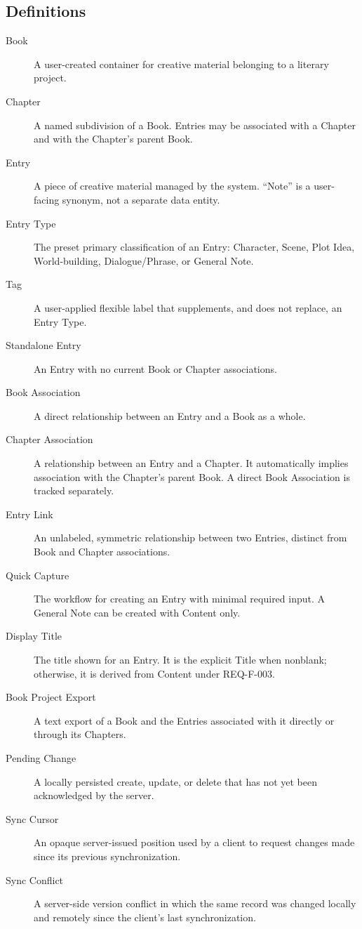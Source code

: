 \documentclass[11pt,a4paper]{article}
\begin{document}
\subsection{Definitions}
\begin{description}
  \item[Book] A user-created container for creative material belonging to a literary project.
  \item[Chapter] A named subdivision of a Book. Entries may be associated with a Chapter and with the Chapter's parent Book.
  \item[Entry] A piece of creative material managed by the system. ``Note'' is a user-facing synonym, not a separate data entity.
  \item[Entry Type] The preset primary classification of an Entry: Character, Scene, Plot Idea, World-building, Dialogue/Phrase, or General Note.
  \item[Tag] A user-applied flexible label that supplements, and does not replace, an Entry Type.
  \item[Standalone Entry] An Entry with no current Book or Chapter associations.
  \item[Book Association] A direct relationship between an Entry and a Book as a whole.
  \item[Chapter Association] A relationship between an Entry and a Chapter. It automatically implies association with the Chapter's parent Book. A direct Book Association is tracked separately.
  \item[Entry Link] An unlabeled, symmetric relationship between two Entries, distinct from Book and Chapter associations.
  \item[Quick Capture] The workflow for creating an Entry with minimal required input. A General Note can be created with Content only.
  \item[Display Title] The title shown for an Entry. It is the explicit Title when nonblank; otherwise, it is derived from Content under REQ-F-003.
  \item[Book Project Export] A text export of a Book and the Entries associated with it directly or through its Chapters.
  \item[Pending Change] A locally persisted create, update, or delete that has not yet been acknowledged by the server.
  \item[Sync Cursor] An opaque server-issued position used by a client to request changes made since its previous synchronization.
  \item[Sync Conflict] A server-side version conflict in which the same record was changed locally and remotely since the client's last synchronization.
\end{description}
\end{document}
